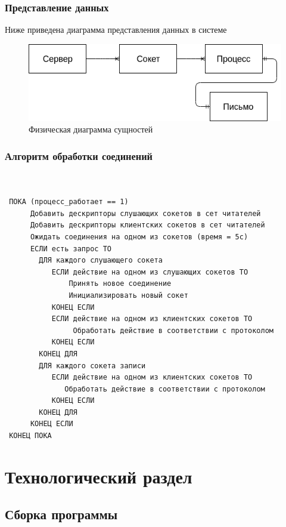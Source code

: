 \documentclass[a4paper,12pt]{report}
\begin{document}
\subsection*{Представление данных}
Ниже приведена диаграмма представления данных в системе
\begin{figure}
\centering
\includegraphics[width=\textwidth]{static/physical.png}
\caption{Физическая диаграмма сущностей}
\label{fig:phys_diagram}
\end{figure}


\subsection{Алгоритм обработки соединений}
\begin{verbatim}


 ПОКА (процесс_работает == 1) 
      Добавить дескрипторы слушающих сокетов в сет читателей 
      Добавить дескрипторы клиентских сокетов в сет читателей 
      Ожидать соединения на одном из сокетов (время = 5с) 
      ЕСЛИ есть запрос ТО 
        ДЛЯ каждого слушающего сокета 
           ЕСЛИ действие на одном из слушающих сокетов ТО 
               Принять новое соединение 
               Инициализировать новый сокет 
           КОНЕЦ ЕСЛИ 
           ЕСЛИ действие на одном из клиентских сокетов ТО 
           		Обработать действие в соответствии с протоколом 
           КОНЕЦ ЕСЛИ 
        КОНЕЦ ДЛЯ 
        ДЛЯ каждого сокета записи
           ЕСЛИ действие на одном из клиентских сокетов ТО 
              Обработать действие в соответствии с протоколом 
           КОНЕЦ ЕСЛИ 
        КОНЕЦ ДЛЯ 
      КОНЕЦ ЕСЛИ 
 КОНЕЦ ПОКА 

\end{verbatim}

\chapter{Технологический раздел}

\section{Сборка программы}
\end{document}
